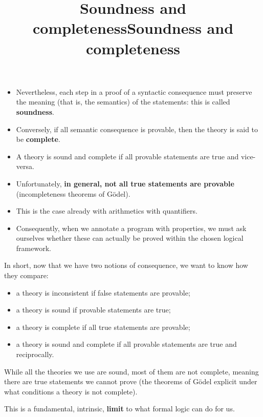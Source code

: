 \documentclass[wide]{slides}
\begin{document}
\begin{slide}
  \title{Soundness and completeness}

  \begin{itemize}

    \item Nevertheless, each step in a proof of a syntactic
      consequence must preserve the meaning (that is, the semantics)
      of the statements: this is called \textbf{soundness}.

    \item Conversely, if all semantic consequence is provable, then
      the theory is said to be \textbf{complete}.

    \item A theory is sound and complete if all provable statements
      are true and vice-versa.

    \item Unfortunately, \textbf{in general, not all true statements
      are provable} (incompleteness theorems of G\"odel).

    \item This is the case already with arithmetics with quantifiers.

    \item Consequently, when we annotate a program with properties, we
      must ask ourselves whether these can actually be proved within
      the chosen logical framework.

  \end{itemize}

\end{slide}

\begin{slide}
  \title{Soundness and completeness}

  In short, now that we have two notions of consequence, we want to
  know how they compare:
  \begin{itemize}

    \item a theory is inconsistent if false statements are provable;

    \item a theory is sound if provable statements are true;

    \item a theory is complete if all true statements are provable;

    \item a theory is sound and complete if all provable statements
      are true and reciprocally.

  \end{itemize}
  While all the theories we use are sound, most of them are not
  complete, meaning there are true statements we cannot prove (the
  theorems of G\"odel explicit under what conditions a theory is not
  complete).

  \medskip

  This is a fundamental, intrinsic, \textbf{limit} to what formal
  logic can do for us.

\end{slide}
\end{document}
